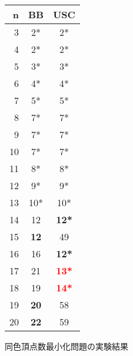 \begin{tabular}{r|c|c}
 \hline
 n&BB &USC\\
 \hline
 3&2*&2*\\
 4&2*&2*\\
 5&3*&3*\\
 6&4*&4*\\
 7&5*&5*\\
 8&7*&7*\\
 9&7*&7*\\
 10&7*&7*\\
 11&8*&8*\\
 12&9*&9*\\
 13&10*&10*\\
 14&12&\textbf{12*}\\
 15&\textbf{12}&49\\
 16&16&\textbf{12*}\\
 17&21&\textbf{\textcolor{red}{13*}}\\
 18&19&\textbf{\textcolor{red}{14*}}\\
 19&\textbf{20}&58\\
 20&\textbf{22}&59\\
\end{tabular}
 \caption{同色頂点数最小化問題の実験結果}
 \label{table:min}
